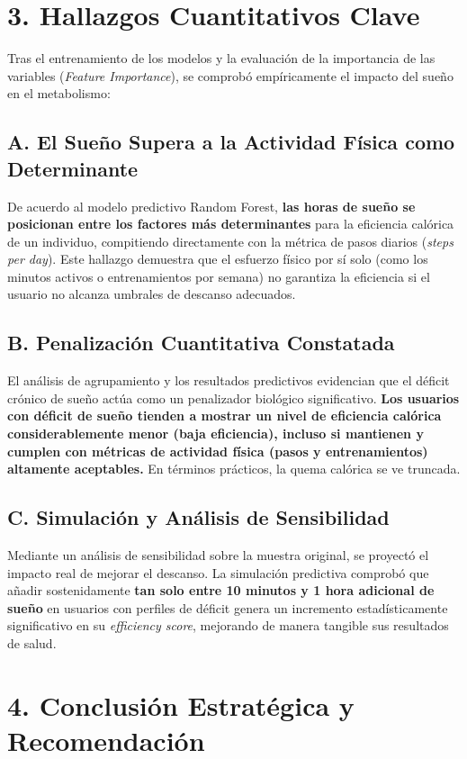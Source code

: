 \documentclass{article}
\begin{document}
\section*{3. Hallazgos Cuantitativos Clave}

Tras el entrenamiento de los modelos y la evaluación de la importancia de las variables (\textit{Feature Importance}), se comprobó empíricamente el impacto del sueño en el metabolismo:

\subsection*{A. El Sueño Supera a la Actividad Física como Determinante}
De acuerdo al modelo predictivo Random Forest, \textbf{las horas de sueño se posicionan entre los factores más determinantes} para la eficiencia calórica de un individuo, compitiendo directamente con la métrica de pasos diarios (\textit{steps per day}). Este hallazgo demuestra que el esfuerzo físico por sí solo (como los minutos activos o entrenamientos por semana) no garantiza la eficiencia si el usuario no alcanza umbrales de descanso adecuados.

\subsection*{B. Penalización Cuantitativa Constatada}
El análisis de agrupamiento y los resultados predictivos evidencian que el déficit crónico de sueño actúa como un penalizador biológico significativo. \textbf{Los usuarios con déficit de sueño tienden a mostrar un nivel de eficiencia calórica considerablemente menor (baja eficiencia), incluso si mantienen y cumplen con métricas de actividad física (pasos y entrenamientos) altamente aceptables.} En términos prácticos, la quema calórica se ve truncada.

\subsection*{C. Simulación y Análisis de Sensibilidad}
Mediante un análisis de sensibilidad sobre la muestra original, se proyectó el impacto real de mejorar el descanso. La simulación predictiva comprobó que añadir sostenidamente \textbf{tan solo entre 10 minutos y 1 hora adicional de sueño} en usuarios con perfiles de déficit genera un incremento estadísticamente significativo en su \textit{efficiency score}, mejorando de manera tangible sus resultados de salud.

\section*{4. Conclusión Estratégica y Recomendación}
\end{document}

